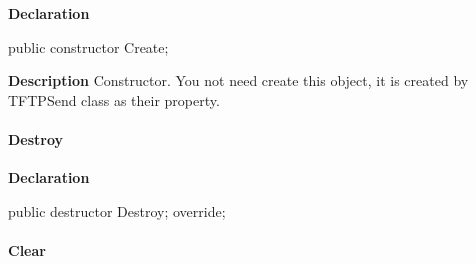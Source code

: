 \documentclass{report}
\newif\ifpdf
\begin{document}
\label{ftpsend.TFTPList-Create}
\begin{list}{}{
\setlength{\itemindent}{0cm}
\setlength{\listparindent}{0cm}
\setlength{\leftmargin}{\evensidemargin}
\addtolength{\leftmargin}{\tmplength}
\settowidth{\labelsep}{X}
\addtolength{\leftmargin}{\labelsep}
\setlength{\labelwidth}{\tmplength}
}
\item[\textbf{Declaration}\hfill]
\ifpdf
\begin{flushleft}
\fi
\begin{ttfamily}
public constructor Create;\end{ttfamily}

\ifpdf
\end{flushleft}
\fi

\par
\item[\textbf{Description}]
Constructor. You not need create this object, it is created by TFTPSend class as their property.

\end{list}
\paragraph*{Destroy}\hspace*{\fill}

\label{ftpsend.TFTPList-Destroy}
\begin{list}{}{
\setlength{\itemindent}{0cm}
\setlength{\listparindent}{0cm}
\setlength{\leftmargin}{\evensidemargin}
\addtolength{\leftmargin}{\tmplength}
\settowidth{\labelsep}{X}
\addtolength{\leftmargin}{\labelsep}
\setlength{\labelwidth}{\tmplength}
}
\item[\textbf{Declaration}\hfill]
\ifpdf
\begin{flushleft}
\fi
\begin{ttfamily}
public destructor Destroy; override;\end{ttfamily}

\ifpdf
\end{flushleft}
\fi

\end{list}
\paragraph*{Clear}\hspace*{\fill}
\end{document}
